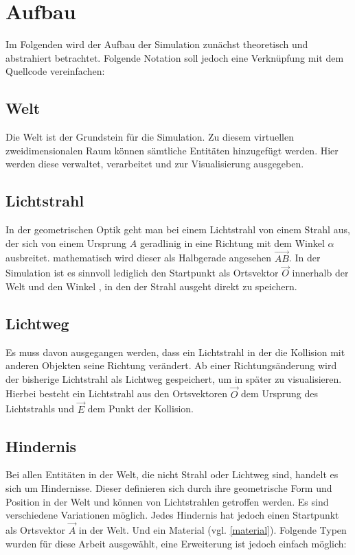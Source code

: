 \chapter{Aufbau}
Im Folgenden wird der Aufbau der Simulation zunächst theoretisch und abstrahiert betrachtet. 
Folgende Notation soll jedoch eine Verknüpfung mit dem Quellcode vereinfachen: 

\section{Welt}
Die Welt  ist der Grundstein für die Simulation. 
Zu diesem virtuellen zweidimensionalen Raum können sämtliche Entitäten hinzugefügt werden. 
Hier werden diese verwaltet, verarbeitet und zur Visualisierung ausgegeben. 

\section{Lichtstrahl}
In der geometrischen Optik geht man bei einem Lichtstrahl  
von einem Strahl aus, der sich von einem Ursprung $ A $  
geradlinig in eine Richtung mit dem Winkel 
$ \alpha $ ausbreitet. \parencite[vgl.][S. 1041]{tipler2015physik} mathematisch 
wird dieser als Halbgerade angesehen $ \overrightarrow{AB} $. 
In der Simulation ist es sinnvoll lediglich den Startpunkt als Ortsvektor $ \vec{O} $  innerhalb der Welt
und den Winkel , in den der Strahl ausgeht direkt zu speichern. 

\section{Lichtweg}
Es muss davon ausgegangen werden, dass ein Lichtstrahl in der 
die Kollision mit anderen Objekten seine Richtung verändert. 
Ab einer Richtungsänderung wird der bisherige Lichtstrahl als Lichtweg  
gespeichert, um in später zu visualisieren.
Hierbei besteht ein Lichtstrahl aus den Ortsvektoren $ \vec{O} $  dem 
Ursprung des Lichtstrahls und $ \vec{E} $  dem Punkt der Kollision.

\section{Hindernis}
Bei allen Entitäten in der Welt, die nicht Strahl oder Lichtweg sind, 
handelt es sich um Hindernisse. 
Dieser definieren sich durch ihre geometrische Form und Position in der Welt 
und können von Lichtstrahlen getroffen werden.
Es sind verschiedene Variationen möglich. Jedes Hindernis  
hat jedoch einen Startpunkt als Ortsvektor $ \vec{A} $  in der Welt. 
Und ein Material  (vgl. \ref{material}). 
Folgende Typen wurden für diese Arbeit ausgewählt, eine Erweiterung ist jedoch einfach möglich: 

